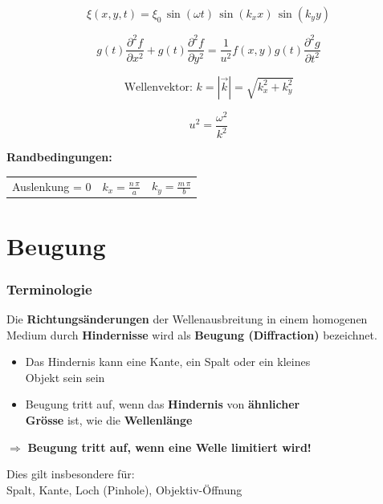 \hfill
\begin{minipage}{0.68\linewidth}
	$$ \boxed{ \xi(x,y,t) = \xi_0 \, \sin(\omega t) \, \sin(k_x x) \, \sin(k_y y)  } $$

	$$ \boxed{ g(t)\frac{\partial^2f}{\partial x^2} + g(t)\frac{\partial^2f}{\partial y^2} = \frac{1}{u^2}f(x,y)g(t)\frac{\partial^2g}{\partial t^2} } $$

	$$ \boxed{ \text{Wellenvektor: } k = |\vec{k}| = \sqrt{k_x^2 + k_y^2}} $$

	$$ \boxed{ u^2 = \frac{\omega^2}{k^2}} $$
\end{minipage}

\textbf{Randbedingungen:} \\
\vspace{0.1cm}

\begin{tabular}{l c c }
Auslenkung = 0 &  $ \boxed{ k_x = \frac{n \, \pi}{a} }$ & $ \boxed{ k_y = \frac{m \, \pi}{b} }$
\end{tabular} 





\section{Beugung}

\subsubsection{Terminologie}

Die \textbf{Richtungsänderungen} der Wellenausbreitung in einem homogenen Medium durch \textbf{Hindernisse} wird als \textbf{Beugung (Diffraction)} bezeichnet. \\
\begin{itemize}
	\item Das Hindernis kann eine Kante, ein Spalt oder ein kleines \\
	Objekt sein sein 
	\item Beugung tritt auf, wenn das \textbf{Hindernis} von \textbf{ähnlicher}\\
	\textbf{Grösse} ist, wie die \textbf{Wellenlänge} 
\end{itemize}


$\Rightarrow$ \textbf{Beugung tritt auf, wenn eine Welle limitiert wird!} \\
\vspace{0.2cm}

Dies gilt insbesondere für: \\
Spalt, Kante, Loch (Pinhole), Objektiv-Öffnung



